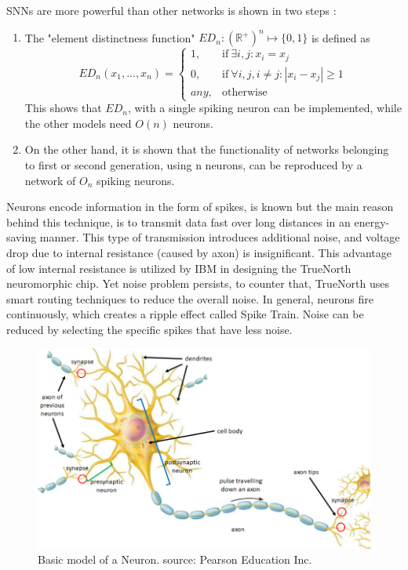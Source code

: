 \documentclass[11pt,twoside]{article}
\begin{document}
\par
SNNs are more powerful than other networks is shown in two steps \cite{maass1997networks, durer2001esynn}:
\begin{enumerate}
  \item The "element distinctness function" ${ED}_n:{(\mathbb{R}^+)}^n\longmapsto \{0,1\}$ is defined as
  \begin{equation}
    {ED}_n(x_1,...,x_n)=
    \begin{cases}
      1, & \text{if}\ \exists i,j:x_i=x_j \\
      0, & \text{if}\ \forall i,j,i \neq j:|x_i-x_j| \geq 1 \\
      any, & \text{otherwise}
    \end{cases}
    \end{equation}
     This shows that $ED_n$, with a single spiking neuron can be implemented, while the other models need $O(n)$ neurons.
  
  \item On the other hand, it is shown that the functionality of networks belonging to first or second generation, using n neurons, can be reproduced by a network of $O_n$ spiking neurons.
\end{enumerate}

\par
Neurons encode information in the form of spikes, is known but the main reason behind this technique, is to transmit data fast over long distances in an energy-saving manner. This type of transmission introduces additional noise, and voltage drop due to internal resistance (caused by axon) is insignificant. This advantage of low internal resistance is utilized by IBM in designing the TrueNorth neuromorphic chip. Yet noise problem persists, to counter that, TrueNorth uses smart routing techniques to reduce the overall noise. In general, neurons fire continuously, which creates a ripple effect called Spike Train. Noise can be reduced by selecting the specific spikes that have less noise. 
\begin{figure}
	\centering
	\includegraphics[width=0.8\linewidth]{Report-LateX-Template/fig/neuron.png}
	\caption{Basic model of a Neuron. source: Pearson Education Inc.}
	\label{fig:neuron}
\end{figure}
\end{document}
